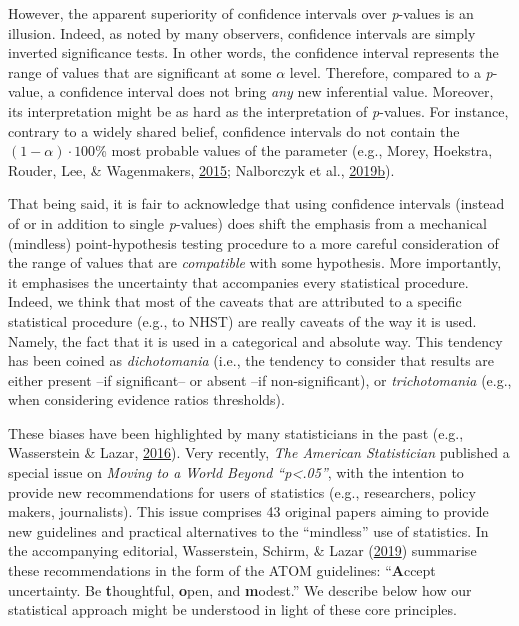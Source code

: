 \documentclass[a4paper,12pt,twoside,onecolumn,openright,final,oldfontcommands]{memoir}
\begin{document}
However, the apparent superiority of confidence intervals over \emph{p}-values is an illusion. Indeed, as noted by many observers, confidence intervals are simply inverted significance tests. In other words, the confidence interval represents the range of values that are significant at some \(\alpha\) level. Therefore, compared to a \emph{p}-value, a confidence interval does not bring \emph{any} new inferential value. Moreover, its interpretation might be as hard as the interpretation of \emph{p}-values. For instance, contrary to a widely shared belief, confidence intervals do not contain the \((1 - \alpha) \cdot 100\)\% most probable values of the parameter (e.g., Morey, Hoekstra, Rouder, Lee, \& Wagenmakers, \protect\hyperlink{ref-morey_fallacy_2015}{2015}; Nalborczyk et al., \protect\hyperlink{ref-nalborczyk_pragmatism_2019}{2019}\protect\hyperlink{ref-nalborczyk_pragmatism_2019}{b}).

That being said, it is fair to acknowledge that using confidence intervals (instead of or in addition to single \emph{p}-values) does shift the emphasis from a mechanical (mindless) point-hypothesis testing procedure to a more careful consideration of the range of values that are \emph{compatible} with some hypothesis. More importantly, it emphasises the uncertainty that accompanies every statistical procedure. Indeed, we think that most of the caveats that are attributed to a specific statistical procedure (e.g., to NHST) are really caveats of the way it is used. Namely, the fact that it is used in a categorical and absolute way. This tendency has been coined as \emph{dichotomania} (i.e., the tendency to consider that results are either present --if significant-- or absent --if non-significant), or \emph{trichotomania} (e.g., when considering evidence ratios thresholds).

These biases have been highlighted by many statisticians in the past (e.g., Wasserstein \& Lazar, \protect\hyperlink{ref-wasserstein_asas_2016}{2016}). Very recently, \emph{The American Statistician} published a special issue on \emph{Moving to a World Beyond \enquote{p\textless.05}}, with the intention to provide new recommendations for users of statistics (e.g., researchers, policy makers, journalists). This issue comprises 43 original papers aiming to provide new guidelines and practical alternatives to the \enquote{mindless} use of statistics. In the accompanying editorial, Wasserstein, Schirm, \& Lazar (\protect\hyperlink{ref-wasserstein_moving_2019}{2019}) summarise these recommendations in the form of the ATOM guidelines: \enquote{\textbf{A}ccept uncertainty. Be \textbf{t}houghtful, \textbf{o}pen, and \textbf{m}odest.} We describe below how our statistical approach might be understood in light of these core principles.
\end{document}
